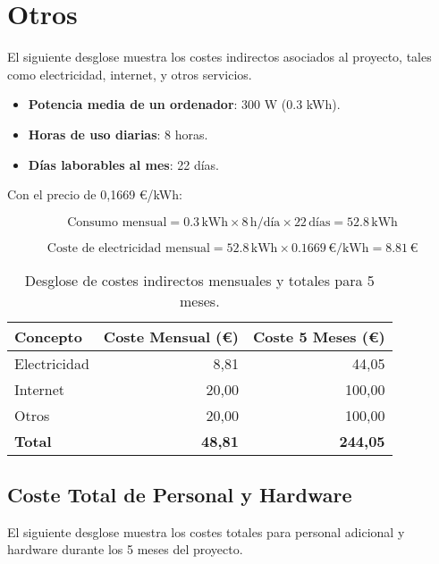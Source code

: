     
\section{Otros}
    El siguiente desglose muestra los costes indirectos asociados al proyecto, tales como electricidad, internet, y otros servicios.

    \begin{itemize}
        \item \textbf{Potencia media de un ordenador}: 300 W (0.3 kWh).
        \item \textbf{Horas de uso diarias}: 8 horas.
        \item \textbf{Días laborables al mes}: 22 días.
    \end{itemize}
    
    Con el precio de 0,1669 €/kWh:
    
    \[
    \text{Consumo mensual} = 0.3 \, \text{kWh} \times 8 \, \text{h/día} \times 22 \, \text{días} = 52.8 \, \text{kWh}
    \]
    
    \[
    \text{Coste de electricidad mensual} = 52.8 \, \text{kWh} \times 0.1669 \, \text{€/kWh} = 8.81 \, \text{€}
    \]
    
    \begin{table}[h!]
    \centering
    \begin{tabular}{lrr}
        \toprule
        \textbf{Concepto} & \textbf{Coste Mensual (€)} & \textbf{Coste 5 Meses (€)} \\
        \midrule
        Electricidad & 8,81 & 44,05 \\
        Internet & 20,00 & 100,00 \\
        Otros & 20,00 & 100,00 \\
        \textbf{Total} & \textbf{48,81} & \textbf{244,05} \\
        \bottomrule
    \end{tabular}
    \caption{Desglose de costes indirectos mensuales y totales para 5 meses.}
    \end{table}
    

    \subsection{Coste Total de Personal y Hardware}

    El siguiente desglose muestra los costes totales para personal adicional y hardware durante los 5 meses del proyecto.
    

